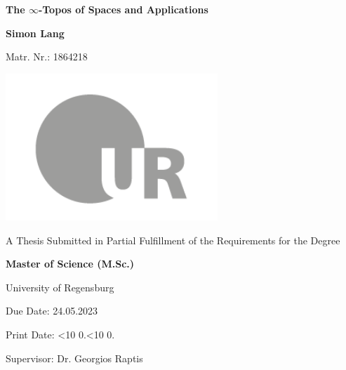 \documentclass[a4paper,10pt]{scrreprt}
\newcommand{\leadingzero}[1]{\ifnum #1<10 0\the#1\else\the#1\fi}
\newcommand{\todayA}{\leadingzero{\day}.\leadingzero{\month}.\the\year}
\begin{document}
\begin{titlepage}
    \begin{center}
        \vspace*{1cm}
 
        \Huge
        \textbf{The $\infty$-Topos of Spaces and Applications}
 
        \vspace{0.5cm}
        \LARGE
 
        \vspace{1.5cm}
 
        \textbf{Simon Lang}

        \large 
        Matr. Nr.: 1864218
 		
 		\vfill
         \includegraphics[width=0.6\textwidth]{ur-logo-bildmarke-grau.png}
 
        \vfill
        \normalsize
        A Thesis Submitted in Partial Fulfillment of the Requirements for the Degree

        \LARGE
        \textbf{Master of Science (M.Sc.)}

        \vspace{0.8cm}
 
        \Large
        University of Regensburg

        Due Date: 24.05.2023

        Print Date: \todayA

        Supervisor: Dr. Georgios Raptis
 
    \end{center}
\end{titlepage}
\end{document}
